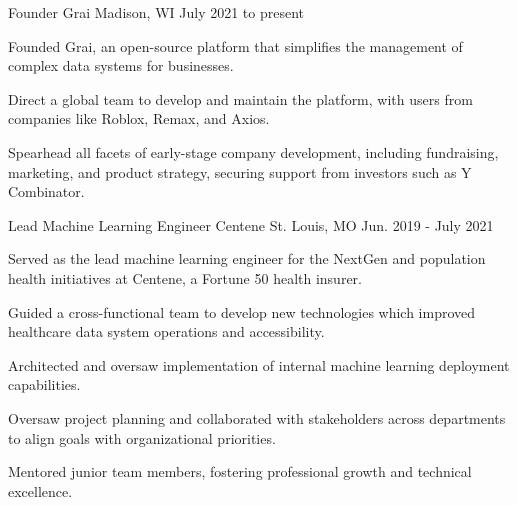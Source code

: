 

\begin{cventries}
  \cventry
    {Founder} %
    {Grai} %
    {Madison, WI} %
    {July 2021 to present} %
    {
      \begin{cvitems} %
        \item {Founded Grai, an open-source platform that simplifies the management of complex data systems for businesses.}
        \item {Direct a global team to develop and maintain the platform, with users from companies like Roblox, Remax, and Axios.}
        \item {Spearhead all facets of early-stage company development, including fundraising, marketing, and product strategy, securing support from investors such as Y Combinator.}
      \end{cvitems}
    }

  \cventry
    {Lead Machine Learning Engineer} %
    {Centene} %
    {St. Louis, MO} %
    {Jun. 2019 - July 2021} %
    {
      \begin{cvitems} %
        \item {Served as the lead machine learning engineer for the NextGen and population health initiatives at Centene, a Fortune 50 health insurer.}
        \item {Guided a cross-functional team to develop new technologies which improved healthcare data system operations and accessibility.}
        \item {Architected and oversaw implementation of internal machine learning deployment capabilities.}
        \item {Oversaw project planning and collaborated with stakeholders across departments to align goals with organizational priorities.}
        \item {Mentored junior team members, fostering professional growth and technical excellence.}
      \end{cvitems}
    }


\end{cventries}
